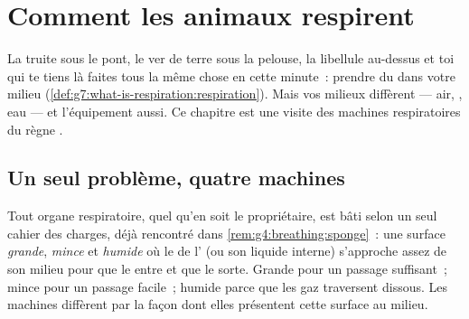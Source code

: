 \chapter{Comment les animaux respirent}\label{ch:g7:how-animals-breathe}

La truite sous le pont, le ver de terre sous la pelouse, la
libellule au-dessus et toi qui te tiens là faites tous la même chose
en cette minute~: prendre du  dans votre milieu
(\cref{def:g7:what-is-respiration:respiration}). Mais vos milieux
diffèrent --- air, , eau --- et l'équipement aussi. Ce chapitre
est une visite des machines respiratoires du règne .

\section{Un seul problème, quatre machines}

\begin{proposition}\label{prop:g7:how-animals-breathe:spec}
Tout organe respiratoire, quel qu'en soit le propriétaire, est bâti
selon un seul cahier des charges, déjà rencontré dans
\cref{rem:g4:breathing:sponge}~: une surface \emph{grande},
\emph{mince} et \emph{humide} où le  de l' (ou son liquide
interne) s'approche assez de son milieu pour que le  entre
et que le  sorte. Grande pour un passage
suffisant~; mince pour un passage facile~; humide parce que les gaz
traversent dissous. Les machines diffèrent par la façon dont elles
présentent cette surface au milieu.
\end{proposition}
\admitted


